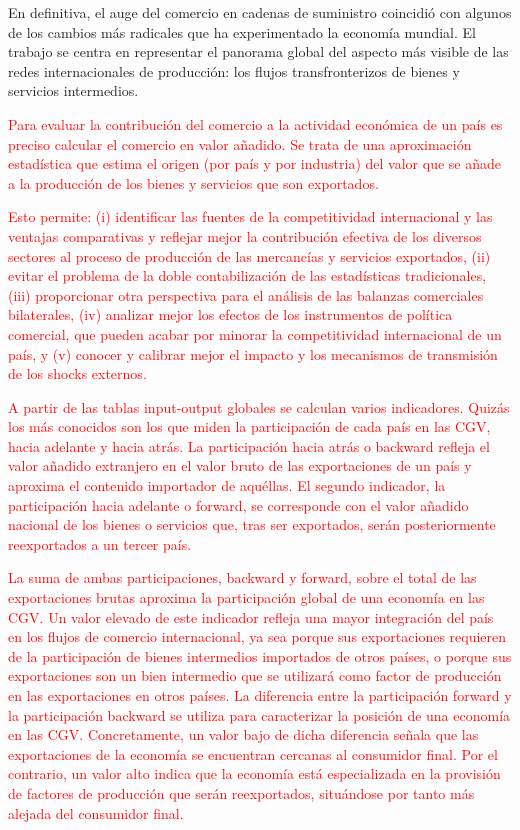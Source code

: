 \documentclass[10pt,a4paper]{article}
\begin{document}
En definitiva, el auge del comercio en cadenas de suministro coincidió con algunos de los cambios más radicales que ha experimentado la economía mundial. El trabajo se centra en representar el panorama global del aspecto más visible de las redes internacionales de producción: los flujos transfronterizos de bienes y servicios intermedios. 



\textcolor{red}{Para evaluar la contribución del comercio a la actividad económica de un país es preciso calcular el comercio en valor añadido. Se trata de una aproximación estadística que estima el origen (por país y por industria) del valor que se añade a la producción de los bienes y servicios que son exportados.

Esto permite: (i) identificar las fuentes de la competitividad internacional y las ventajas comparativas y reflejar mejor la contribución efectiva de los diversos sectores al proceso de producción de las mercancías y servicios exportados, (ii) evitar el problema de la doble contabilización de las estadísticas tradicionales, (iii) proporcionar otra perspectiva para el análisis de las balanzas comerciales bilaterales, (iv) analizar mejor los efectos de los instrumentos de política comercial, que pueden acabar por minorar la competitividad internacional de un país, y (v) conocer y calibrar mejor el impacto y los mecanismos de transmisión de los shocks externos. 

A partir de las tablas input-output globales se calculan varios indicadores. Quizás los más conocidos son los que miden la participación de cada país en las CGV, hacia adelante y hacia atrás. La participación hacia atrás o backward refleja el valor añadido extranjero en el valor bruto de las exportaciones de un país y aproxima el contenido importador de aquéllas. El segundo indicador, la participación hacia adelante o forward, se corresponde con el valor añadido nacional de los bienes o servicios que, tras ser exportados, serán posteriormente reexportados a un tercer país.

La suma de ambas participaciones, backward y forward, sobre el total de las exportaciones brutas aproxima la participación global de una economía en las CGV. Un valor elevado de este indicador refleja una mayor integración del país en los flujos de comercio internacional, ya sea porque sus exportaciones requieren de la participación de bienes intermedios importados de otros países, o porque sus exportaciones son un bien intermedio que se utilizará como factor de producción en las exportaciones en otros países. La diferencia entre la participación forward y la participación backward se utiliza para caracterizar la posición de una economía en las CGV. Concretamente, un valor bajo de dicha diferencia señala que las exportaciones de la economía se encuentran cercanas al consumidor final. Por el contrario, un valor alto indica que la economía está especializada en la provisión de factores de producción que serán reexportados, situándose por tanto más alejada del consumidor final.

}
\end{document}
